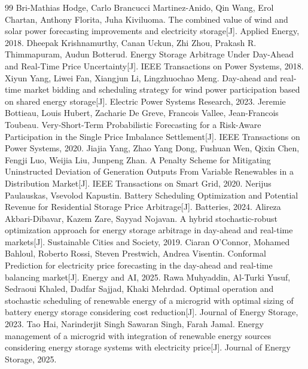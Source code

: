 \begin{thebibliography}{99}
Bri-Mathias Hodge, Carlo Brancucci Martinez-Anido, Qin Wang, Erol Chartan, Anthony Florita, Juha Kiviluoma. The combined value of wind and solar power forecasting improvements and electricity storage[J]. Applied Energy, 2018.
Dheepak Krishnamurthy, Canan Uckun, Zhi Zhou, Prakash R. Thimmapuram, Audun Botterud. Energy Storage Arbitrage Under Day-Ahead and Real-Time Price Uncertainty[J]. IEEE Transactions on Power Systems, 2018.
Xiyun Yang, Liwei Fan, Xiangjun Li, Lingzhuochao Meng. Day-ahead and real-time market bidding and scheduling strategy for wind power participation based on shared energy storage[J]. Electric Power Systems Research, 2023.
Jeremie Bottieau, Louis Hubert, Zacharie De Greve, Francois Vallee, Jean-Francois Toubeau. Very-Short-Term Probabilistic Forecasting for a Risk-Aware Participation in the Single Price Imbalance Settlement[J]. IEEE Transactions on Power Systems, 2020.
Jiajia Yang, Zhao Yang Dong, Fushuan Wen, Qixin Chen, Fengji Luo, Weijia Liu, Junpeng Zhan. A Penalty Scheme for Mitigating Uninstructed Deviation of Generation Outputs From Variable Renewables in a Distribution Market[J]. IEEE Transactions on Smart Grid, 2020.
Nerijus Paulauskas, Vsevolod Kapustin. Battery Scheduling Optimization and Potential Revenue for Residential Storage Price Arbitrage[J]. Batteries, 2024.
Alireza Akbari-Dibavar, Kazem Zare, Sayyad Nojavan. A hybrid stochastic-robust optimization approach for energy storage arbitrage in day-ahead and real-time markets[J]. Sustainable Cities and Society, 2019.
Ciaran O'Connor, Mohamed Bahloul, Roberto Rossi, Steven Prestwich, Andrea Visentin. Conformal Prediction for electricity price forecasting in the day-ahead and real-time balancing market[J]. Energy and AI, 2025.
Rawa Muhyaddin, Al-Turki Yusuf, Sedraoui Khaled, Dadfar Sajjad, Khaki Mehrdad. Optimal operation and stochastic scheduling of renewable energy of a microgrid with optimal sizing of battery energy storage considering cost reduction[J]. Journal of Energy Storage, 2023.
Tao Hai, Narinderjit Singh Sawaran Singh, Farah Jamal. Energy management of a microgrid with integration of renewable energy sources considering energy storage systems with electricity price[J]. Journal of Energy Storage, 2025.
\end{thebibliography}
